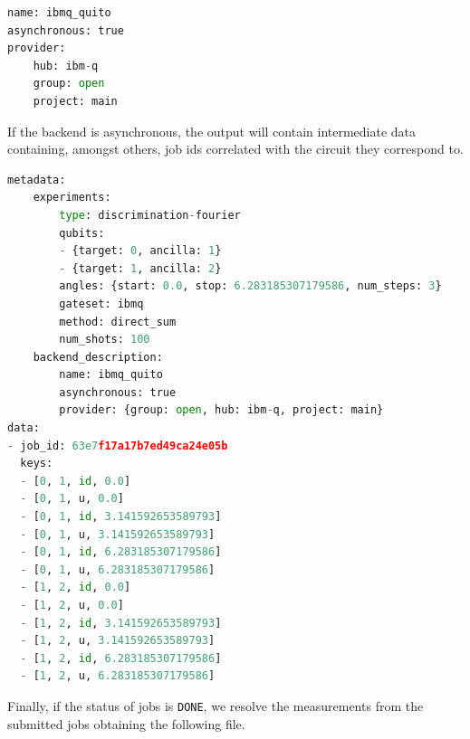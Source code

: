 \documentclass[preprint,12pt, a4paper, dvipsnames]{elsarticle}
\newcommand{\1}{{\rm 1\hspace{-0.9mm}l}}
\theoremstyle{definition}
\begin{document}
\begin{lstlisting}[language=Python, caption=Backend file]
name: ibmq_quito
asynchronous: true
provider:
	hub: ibm-q
	group: open
	project: main

\end{lstlisting}
If the backend is asynchronous, the output will contain intermediate data
containing, amongst others, job ids correlated with the circuit they
correspond to.

\begin{lstlisting}[language=Python, caption=Resolved results]
metadata:
	experiments:
		type: discrimination-fourier
		qubits:
		- {target: 0, ancilla: 1}
		- {target: 1, ancilla: 2}
		angles: {start: 0.0, stop: 6.283185307179586, num_steps: 3}
		gateset: ibmq
		method: direct_sum
		num_shots: 100
	backend_description:
		name: ibmq_quito
		asynchronous: true
		provider: {group: open, hub: ibm-q, project: main}
data:
- job_id: 63e7f17a17b7ed49ca24e05b
  keys:
  - [0, 1, id, 0.0]
  - [0, 1, u, 0.0]
  - [0, 1, id, 3.141592653589793]
  - [0, 1, u, 3.141592653589793]
  - [0, 1, id, 6.283185307179586]
  - [0, 1, u, 6.283185307179586]
  - [1, 2, id, 0.0]
  - [1, 2, u, 0.0]
  - [1, 2, id, 3.141592653589793]
  - [1, 2, u, 3.141592653589793]
  - [1, 2, id, 6.283185307179586]
  - [1, 2, u, 6.283185307179586]

\end{lstlisting}
Finally, if the status of jobs is \texttt{DONE}, we resolve the measurements from the
submitted jobs obtaining the following file.
\end{document}
